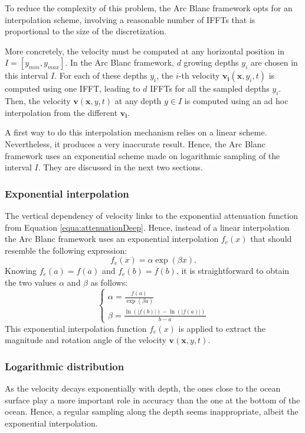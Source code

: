 \documentclass[11pt]{article}
\def\framework{the Arc Blanc framework\xspace}
\begin{document}
To reduce the complexity of this problem, \framework opts for an interpolation scheme, involving a reasonable number of IFFTs that is proportional to the size of the discretization.

More concretely, the velocity must be computed at any horizontal position in $I=[y_{min}, y_{max}]$.
In \framework, $d$ growing depths $y_i$ are chosen in this interval $I$.
For each of these depths $y_i$, the $i$-th velocity $\mathbf{v_i}(\mathbf x,y_i,t)$ is computed using one IFFT, leading to $d$ IFFTs for all the sampled depths $y_i$.
Then, the velocity $\mathbf{v}(\mathbf x,y,t)$ at any depth $y\in I$ is computed using an ad hoc interpolation from the different $\mathbf{v_i}$.

A first way to do this interpolation mechanism relies on a linear scheme.
Nevertheless, it produces a very inaccurate result.
Hence, \framework uses an exponential scheme made on logarithmic sampling of the interval $I$.
They are discussed in the next two sections.

\subsubsection{Exponential interpolation}
The vertical dependency of velocity links to the exponential attenuation function from Equation \ref{equa:attenuationDeep}.
Hence, instead of a linear interpolation \framework uses an exponential interpolation $f_e(x)$ that should resemble the following expression:
\begin{equation}
	f_e(x)=\alpha \exp(\beta x).
\end{equation}
Knowing $f_e(a)=f(a)$ and $f_e(b)=f(b)$, it is straightforward to obtain the two values $\alpha$ and $\beta$ as follows:
\begin{equation}
	\begin{cases}
		\displaystyle\alpha = \frac{f(a)}{\exp(\beta a)} \\
		\displaystyle\beta = \frac{\ln(|f(b)|) - \ln(|f(a)|)}{b - a}
	\end{cases}
\end{equation}
This exponential interpolation function $f_e(x)$ is applied to extract the magnitude and rotation angle of the velocity $\mathbf v(\mathbf x,y,t)$.

\subsubsection{Logarithmic distribution}
As the velocity decays exponentially with depth, the ones close to the ocean surface play a more important role in accuracy than the one at the bottom of the ocean.
Hence, a regular sampling along the depth seems inappropriate, albeit the exponential interpolation.
\end{document}

